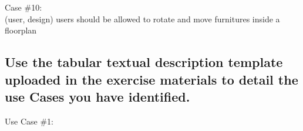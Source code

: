			
			\noindent Case \#10:\\
			(user, design)
			users should be allowed to rotate and move furnitures inside a floorplan\\
		
		
		
		\subsection{Use the tabular textual description template uploaded in the exercise materials
			to detail the use \noindent Cases you have identified.}
		
		\clearpage	
		
			Use Case \#1:
			
			\begin{table}[H]
\end{table}
